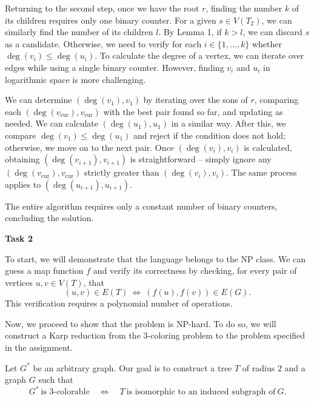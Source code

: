 \documentclass[12pt]{article}
\begin{document}
	\medskip
	
	Returning to the second step, once we have the root \(r\), finding the
	number \(k\) of its children requires only one binary counter. For a given
	\(s \in V(T_{2})\), we can similarly find the number of its children \(l\).
	By Lemma 1, if \(k > l\), we can discard \(s\) as a candidate. Otherwise, we
	need to verify for each \(i \in \{1, \ldots, k\}\) whether \(\deg(v_{i})
	\leqslant \deg(u_{i})\). To calculate the degree of a vertex, we can iterate
	over edges while using a single binary counter. However, finding \(v_{i}\)
	and \(u_{i}\) in logarithmic space is more challenging.
	
	\medskip
	
	We can determine \((\deg(v_{1}), v_{1})\) by iterating over the sons of
	\(r\), comparing each \((\deg(v_{\text{cur}}), v_{\text{cur}})\) with the
	best pair found so far, and updating as needed. We can calculate
	\((\deg(u_{1}), u_{1})\) in a similar way. After this, we compare
	\(\deg(v_{1}) \leqslant \deg(u_{1})\) and reject if the condition does not
	hold; otherwise, we move on to the next pair. Once \((\deg(v_{i}), v_{i})\)
	is calculated, obtaining \((\deg(v_{i + 1}), v_{i + 1})\) is straightforward
	-- simply ignore any \((\deg(v_{\text{cur}}), v_{\text{cur}})\) strictly
	greater than \((\deg(v_{i}), v_{i})\). The same process applies to
	\((\deg(u_{i + 1}), u_{i + 1})\).
	
	\medskip
	
	The entire algorithm requires only a constant number of binary counters,
	concluding the solution.
	
	\bigskip
	
	\textbf{Task 2}
	
	\medskip
	
	To start, we will demonstrate that the language belongs to the NP class. We
	can guess a map function \(f\) and verify its correctness by checking, for
	every pair of vertices \(u, v \in V(T)\), that
	\[ (u, v) \in E(T) \ \iff \ (f(u), f(v)) \in E(G) \text{.} \]
	This verification requires a polynomial number of operations.
	
	\medskip
	
	Now, we proceed to show that the problem is NP-hard. To do so, we will
	construct a Karp reduction from the \(3\)-coloring problem to the problem
	specified in the assignment.
	
	\medskip
	
	Let \(G^{\ast}\) be an arbitrary graph. Our goal is to construct a tree
	\(T\) of radius \(2\) and a graph \(G\) such that
	\begin{equation} \label{eq:eq2}
		G^{\ast} \ \text{is 3-colorable} \quad \iff \quad T \ \text{is
		isomorphic to an induced subgraph of} \ G \text{.}
	\end{equation}
	
\end{document}
